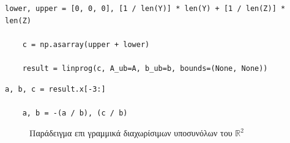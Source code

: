 \documentclass[12pt]{article}
\newcommand{\R}{\mathbb{R}}
\begin{document}
\begin{lstlisting}[caption={Defining vector \textbf{c} and finding a solution to the problem}]
    lower, upper = [0, 0, 0], [1 / len(Y)] * len(Y) + [1 / len(Z)] * len(Z)

    c = np.asarray(upper + lower)

    result = linprog(c, A_ub=A, b_ub=b, bounds=(None, None))
\end{lstlisting}

\begin{lstlisting}[caption={Determining the slope and the y-intercept of the separating line}]
    a, b, c = result.x[-3:]

    a, b = -(a / b), (c / b)
\end{lstlisting}

\begin{figure}[hp]
    \centering
    \qquad
    \caption{Παράδειγμα επι γραμμικά διαχωρίσιμων υποσυνόλων του \( \R^2 \)}
\end{figure}
\end{document}
